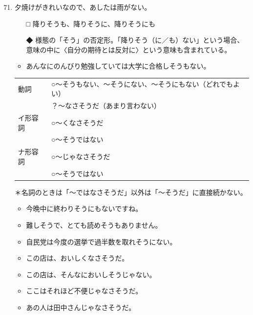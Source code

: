 \documentclass[
uplatex,
b5paper,
10pt,
dvipdfmx
]{jsbook}
\begin{document}
\begin{enumerate}
\setcounter{enumi}{70}

\item 夕焼けがきれいなので、あしたは雨が\underline{\hspace{3zw}}ない。

\begin{itemize}
\item[□] 降りそうも、降りそうに、降りそうにも
\item[◆] 様態の「そう」の否定形。「降りそう（に／も）ない」という場合、
	  意味の中に〈自分の期待とは反対に〉という意味も含まれている。
\end{itemize}
\begin{itemize}
\item あんなにのんびり勉強していては大学に合格しそうもない。
\end{itemize}

\begin{tabular}[t]{ll}
動詞     & ○〜そうもない、〜そうにない、〜そうにもない（どれでもよい） \\
         & ？〜なさそうだ（あまり言わない） \\
イ形容詞 & ○〜くなさそうだ \\
         & ○〜そうではない \\
ナ形容詞 & ○〜じゃなさそうだ \\
         & ○〜そうではない \\
\end{tabular}

＊名詞のときは「〜ではなさそうだ」以外は「〜そうだ」に直接続かない。

\begin{itemize}
 \item 今晩中に終わりそうにもないですね。
 \item 難しそうで、とても読めそうもありません。
 \item 自民党は今度の選挙で過半数を取れそうにない。
 \item この店は、おいしくなさそうだ。
 \item この店は、そんなにおいしそうじゃない。
 \item ここはそれほど不便じゃなさそうだ。  
 \item あの人は田中さんじゃなさそうだ。
\end{itemize}


\end{enumerate}
\end{document}
